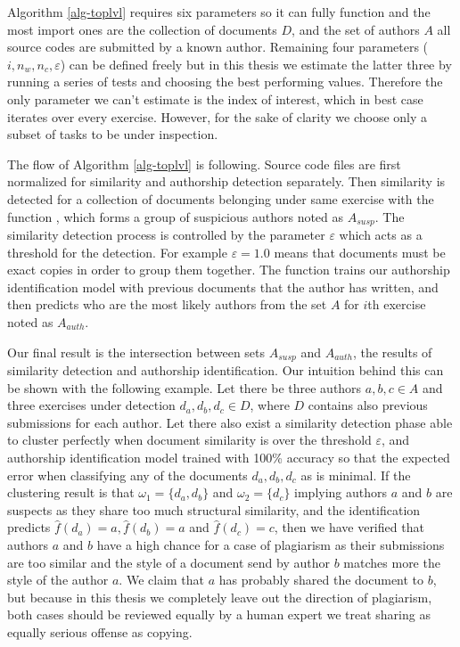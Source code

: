 \noindent
Algorithm \ref{alg-toplvl} requires six parameters so it can fully function and the most import ones are the collection of documents $D$, and the set of authors $A$ \ie all source codes are submitted by a known author. Remaining four parameters ($i, n_w, n_c, \varepsilon$) can be defined freely but in this thesis we estimate the latter three by running a series of tests and choosing the best performing values. Therefore the only parameter we can't estimate is the index of interest, which in best case iterates over every exercise. However, for the sake of clarity we choose only a subset of tasks to be under inspection.   

The flow of Algorithm \ref{alg-toplvl} is following. Source code files are first normalized for similarity and authorship detection separately. Then similarity is detected for a collection of documents belonging under same exercise with the function , which forms a group of suspicious authors noted as $A_{susp}$. The similarity detection process is controlled by the parameter $\varepsilon$ which acts as a threshold for the detection. For example $\varepsilon = 1.0$ means that documents must be exact copies in order to group them together. The function  trains our authorship identification model with previous documents that the author has written, and then predicts who are the most likely authors from the set $A$ for $i$th exercise noted as $A_{auth}$. 

Our final result is the intersection between sets $A_{susp}$ and $A_{auth}$, the results of similarity detection and authorship identification. Our intuition behind this can be shown with the following example. Let there be three authors $a,b,c \in A$ and three exercises under detection $d_a, d_b, d_c \in D$, where $D$ contains also previous submissions for each author. Let there also exist a similarity detection phase able to cluster perfectly when document similarity is over the threshold $\varepsilon$, and authorship identification model trained with 100\% accuracy so that the expected error when classifying any of the documents $d_a, d_b, d_c$ as is minimal. If the clustering result is that $\omega_1 = \{d_a,d_b\}$ and $\omega_2 = \{d_c\}$ implying authors $a$ and $b$ are suspects as they share too much structural similarity, and the identification predicts  $\hat{f}(d_a) = a, \hat{f}(d_b) = a$ and $\hat{f}(d_c) = c$, then we have verified that authors $a$ and $b$ have a high chance for a case of plagiarism as their submissions are too similar and the style of a document send by author $b$ matches more the style of the author $a$. We claim that $a$ has probably shared the document to $b$, but because in this thesis we completely leave out the direction of plagiarism, both cases should be reviewed equally by a human expert \ie we treat sharing as equally serious offense as copying.




